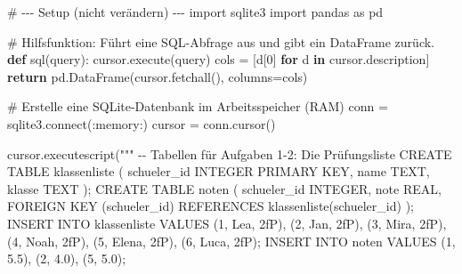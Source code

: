 \documentclass[
  nswissgerman,
  a4paper,
  DIV=11,
  numbers=noendperiod,
  ngerman]{scrreprt}
\newenvironment{Shaded}{\begin{snugshade}}{\end{snugshade}}
\newcommand{\CommentTok}[1]{\textcolor[rgb]{0.37,0.37,0.37}{#1}}
\newcommand{\ControlFlowTok}[1]{\textcolor[rgb]{0.00,0.23,0.31}{\textbf{#1}}}
\newcommand{\DecValTok}[1]{\textcolor[rgb]{0.68,0.00,0.00}{#1}}
\newcommand{\ExtensionTok}[1]{\textcolor[rgb]{0.00,0.23,0.31}{#1}}
\newcommand{\ImportTok}[1]{\textcolor[rgb]{0.00,0.46,0.62}{#1}}
\newcommand{\KeywordTok}[1]{\textcolor[rgb]{0.00,0.23,0.31}{\textbf{#1}}}
\newcommand{\NormalTok}[1]{\textcolor[rgb]{0.00,0.23,0.31}{#1}}
\newcommand{\OperatorTok}[1]{\textcolor[rgb]{0.37,0.37,0.37}{#1}}
\newcommand{\StringTok}[1]{\textcolor[rgb]{0.13,0.47,0.30}{#1}}
\begin{document}
\begin{Shaded}
\begin{Highlighting}[numbers=left,,]
\CommentTok{\# {-}{-}{-} Setup (nicht verändern) {-}{-}{-}}
\ImportTok{import}\NormalTok{ sqlite3}
\ImportTok{import}\NormalTok{ pandas }\ImportTok{as}\NormalTok{ pd}

\CommentTok{\# Hilfsfunktion: Führt eine SQL{-}Abfrage aus und gibt ein DataFrame zurück.}
\KeywordTok{def}\NormalTok{ sql(query):}
\NormalTok{    cursor.execute(query)}
\NormalTok{    cols }\OperatorTok{=}\NormalTok{ [d[}\DecValTok{0}\NormalTok{] }\ControlFlowTok{for}\NormalTok{ d }\KeywordTok{in}\NormalTok{ cursor.description]}
    \ControlFlowTok{return}\NormalTok{ pd.DataFrame(cursor.fetchall(), columns}\OperatorTok{=}\NormalTok{cols)}

\CommentTok{\# Erstelle eine SQLite{-}Datenbank im Arbeitsspeicher (RAM)}
\NormalTok{conn }\OperatorTok{=}\NormalTok{ sqlite3.}\ExtensionTok{connect}\NormalTok{(}\StringTok{\textquotesingle{}:memory:\textquotesingle{}}\NormalTok{)}
\NormalTok{cursor }\OperatorTok{=}\NormalTok{ conn.cursor()}

\NormalTok{cursor.executescript(}\StringTok{"""}
\StringTok{{-}{-} Tabellen für Aufgaben 1{-}2: Die Prüfungsliste}
\StringTok{CREATE TABLE klassenliste (}
\StringTok{    schueler\_id INTEGER PRIMARY KEY,}
\StringTok{    name        TEXT,}
\StringTok{    klasse      TEXT}
\StringTok{);}
\StringTok{CREATE TABLE noten (}
\StringTok{    schueler\_id INTEGER,}
\StringTok{    note        REAL,}
\StringTok{    FOREIGN KEY (schueler\_id) REFERENCES klassenliste(schueler\_id)}
\StringTok{);}
\StringTok{INSERT INTO klassenliste VALUES}
\StringTok{    (1, \textquotesingle{}Lea\textquotesingle{},   \textquotesingle{}2fP\textquotesingle{}),}
\StringTok{    (2, \textquotesingle{}Jan\textquotesingle{},   \textquotesingle{}2fP\textquotesingle{}),}
\StringTok{    (3, \textquotesingle{}Mira\textquotesingle{},  \textquotesingle{}2fP\textquotesingle{}),}
\StringTok{    (4, \textquotesingle{}Noah\textquotesingle{},  \textquotesingle{}2fP\textquotesingle{}),}
\StringTok{    (5, \textquotesingle{}Elena\textquotesingle{}, \textquotesingle{}2fP\textquotesingle{}),}
\StringTok{    (6, \textquotesingle{}Luca\textquotesingle{},  \textquotesingle{}2fP\textquotesingle{});}
\StringTok{INSERT INTO noten VALUES}
\StringTok{    (1, 5.5),}
\StringTok{    (2, 4.0),}
\StringTok{    (5, 5.0);}


\end{Highlighting}
\end{Shaded}
\end{document}

